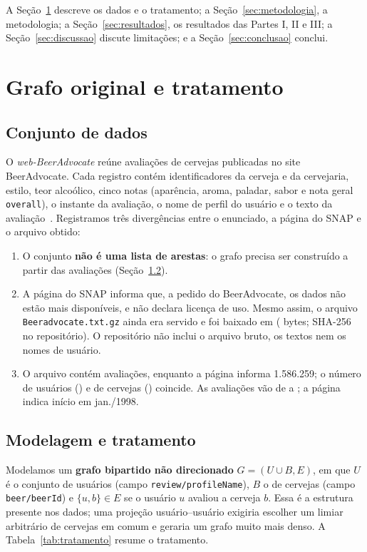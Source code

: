 \documentclass[sigconf]{webmedia}
\begin{document}
A Seção~\ref{sec:dados} descreve os dados e o tratamento; a Seção~\ref{sec:metodologia}, a
metodologia; a Seção~\ref{sec:resultados}, os resultados das Partes I, II e III; a
Seção~\ref{sec:discussao} discute limitações; e a Seção~\ref{sec:conclusao} conclui.

\section{Grafo original e tratamento}\label{sec:dados}

\subsection{Conjunto de dados}
O \textit{web-BeerAdvocate} reúne avaliações de cervejas publicadas no site BeerAdvocate.
Cada registro contém identificadores da cerveja e da cervejaria, estilo, teor alcoólico,
cinco notas (aparência, aroma, paladar, sabor e nota geral \texttt{overall}), o instante
da avaliação, o nome de perfil do usuário e o texto da avaliação~\cite{mcauley2012}.
Registramos três divergências entre o enunciado, a página do SNAP e o arquivo obtido:
\begin{enumerate}
  \item O conjunto \textbf{não é uma lista de arestas}: o grafo precisa ser construído a
  partir das avaliações (Seção~\ref{sec:modelagem}).
  \item A página do SNAP informa que, a pedido do BeerAdvocate, os dados não estão mais
  disponíveis, e não declara licença de uso. Mesmo assim, o arquivo \texttt{Beeradvocate.txt.gz}
  ainda era servido e foi baixado em \DataDownload{} (\NBytesBruto{} bytes; SHA-256 no
  repositório). O repositório não inclui o arquivo bruto, os textos nem os nomes de usuário.
  \item O arquivo contém \NAvLidas{} avaliações, enquanto a página informa 1.586.259; o número
  de usuários (\NUsuarios{}) e de cervejas (\NCervejas{}) coincide. As avaliações vão de
  \DataMin{} a \DataMax{}; a página indica início em jan./1998.
\end{enumerate}

\subsection{Modelagem e tratamento}\label{sec:modelagem}
Modelamos um \textbf{grafo bipartido não direcionado} $G=(U\cup B, E)$, em que $U$ é o
conjunto de usuários (campo \texttt{review/\allowbreak profileName}), $B$ o de cervejas (campo
\texttt{beer/\allowbreak beerId})
e $\{u,b\}\in E$ se o usuário $u$ avaliou a cerveja $b$. Essa é a estrutura presente nos dados;
uma projeção usuário--usuário exigiria escolher um limiar arbitrário de cervejas em comum e
geraria um grafo muito mais denso. A Tabela~\ref{tab:tratamento} resume o tratamento.
\end{document}
